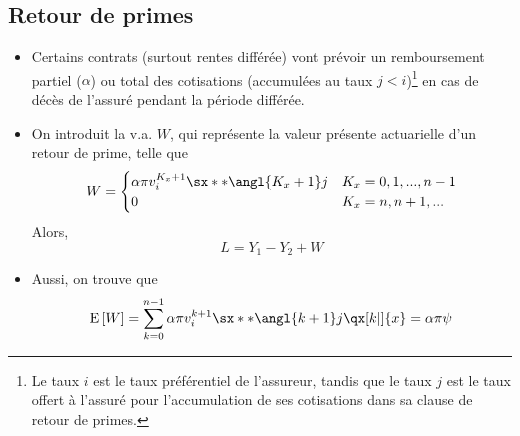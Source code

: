\documentclass[10pt, french]{article}
\begin{document}
\begin{multicols*}{3}
\subsection{Retour de primes}
\begin{itemize}
\item Certains contrats (surtout rentes différée) vont prévoir un remboursement partiel ($\alpha$) ou total des cotisations (accumulées au taux $j < i$)\footnote{Le taux $i$ est le taux préférentiel de l'assureur, tandis que le taux $j$ est le taux offert à l'assuré pour l'accumulation de ses cotisations dans sa clause de retour de primes.} en cas de décès de l'assuré pendant la période différée.
\item On introduit la v.a. $W$, qui représente la valeur présente actuarielle d'un retour de prime, telle que
\begin{align*}
W = 
\begin{cases}
\alpha \pi v_i^{K_x + 1} \sx**{\angl{K_x + 1}j} & K_x = 0, 1, ..., n-1 \\
0	& K_x = n, n+1, ... \\
\end{cases}
\end{align*}
Alors,
\[L = Y_1 - Y_2 + W\]
\item Aussi, on trouve que
\[\esp{W} = \sum_{k=0}^{n - 1} \alpha \pi v_i^{k+1} \sx**{\angl{k+1} j} \qx[k|]{x} = \alpha \pi \psi\]
\end{itemize}


\end{multicols*}
\end{document}
